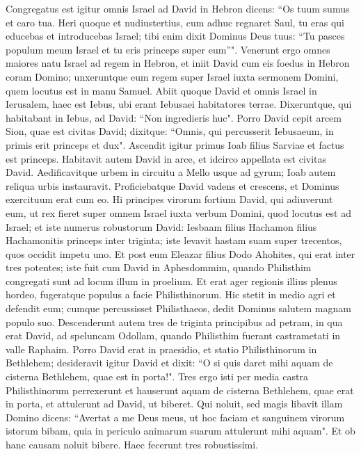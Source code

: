\begin{biblechapter}  
\verse Congregatus est igitur omnis Israel ad David in Hebron dicens: “Os tuum sumus et caro tua. 
\verse Heri quoque et nudiustertius, cum adhuc regnaret Saul, tu eras qui educebas et introducebas Israel; tibi enim dixit Dominus Deus tuus: “Tu pasces populum meum Israel et tu eris princeps super eum”". 
\verse Venerunt ergo omnes maiores natu Israel ad regem in Hebron, et iniit David cum eis foedus in Hebron coram Domino; unxeruntque eum regem super Israel iuxta sermonem Domini, quem locutus est in manu Samuel. 
\verse Abiit quoque David et omnis Israel in Ierusalem, haec est Iebus, ubi erant Iebusaei habitatores terrae. 
\verse Dixeruntque, qui habitabant in Iebus, ad David: “Non ingredieris huc". Porro David cepit arcem Sion, quae est civitas David; 
\verse dixitque: “Omnis, qui percusserit Iebusaeum, in primis erit princeps et dux". Ascendit igitur primus Ioab filius Sarviae et factus est princeps. 
\verse Habitavit autem David in arce, et idcirco appellata est civitas David. 
\verse Aedificavitque urbem in circuitu a Mello usque ad gyrum; Ioab autem reliqua urbis instauravit. 
\verse Proficiebatque David vadens et crescens, et Dominus exercituum erat cum eo. 
\verse Hi principes virorum fortium David, qui adiuverunt eum, ut rex fieret super omnem Israel iuxta verbum Domini, quod locutus est ad Israel; 
\verse et iste numerus robustorum David: Iesbaam filius Hachamon filius Hachamonitis princeps inter triginta; iste levavit hastam suam super trecentos, quos occidit impetu uno. 
\verse Et post eum Eleazar filius Dodo Ahohites, qui erat inter tres potentes; 
\verse iste fuit cum David in Aphesdommim, quando Philisthim congregati sunt ad locum illum in proelium. Et erat ager regionis illius plenus hordeo, fugeratque populus a facie Philisthinorum. 
\verse Hic stetit in medio agri et defendit eum; cumque percussisset Philisthaeos, dedit Dominus salutem magnam populo suo. 
\verse Descenderunt autem tres de triginta principibus ad petram, in qua erat David, ad speluncam Odollam, quando Philisthim fuerant castrametati in valle Raphaim. 
\verse Porro David erat in praesidio, et statio Philisthinorum in Bethlehem;  
\verse desideravit igitur David et dixit: “O si quis daret mihi aquam de cisterna Bethlehem, quae est in porta!". 
\verse Tres ergo isti per media castra Philisthinorum perrexerunt et hauserunt aquam de cisterna Bethlehem, quae erat in porta, et attulerunt ad David, ut biberet. Qui noluit, sed magis libavit illam Domino 
\verse dicens: “Avertat a me Deus meus, ut hoc faciam et sanguinem virorum istorum bibam, quia in periculo animarum suarum attulerunt mihi aquam". Et ob hanc causam noluit bibere. Haec fecerunt tres robustissimi. 

\end{biblechapter}
